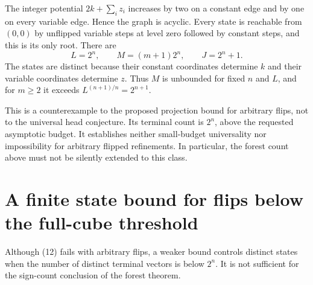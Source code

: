 \documentclass[11pt]{article}
\begin{document}
The integer potential $2k+\sum_i z_i$ increases by two on a constant
edge and by one on every variable edge. Hence the graph is acyclic.
Every state is reachable from $(0,0)$ by unflipped variable steps
at level zero followed by constant steps, and this is its only root. There are
\[
                    L=2^n,\qquad M=(m+1)2^n,\qquad J=2^n+1.
 \tag{18}
\]
The states are distinct because their constant coordinates determine
$k$ and their variable coordinates determine $z$. Thus $M$ is
unbounded for fixed $n$ and $L$, and for $m\ge2$ it exceeds
$L^{(n+1)/n}=2^{n+1}$.

This is a counterexample to the proposed projection bound for arbitrary
flips, not to the universal head conjecture. Its terminal count is
$2^n$, above the requested asymptotic budget. It establishes neither
small-budget universality nor impossibility for arbitrary flipped
refinements. In particular, the forest count above must not be silently
extended to this class.

\section{A finite state bound for flips below the full-cube threshold}

Although (12) fails with arbitrary flips, a weaker bound controls distinct
states when the number of distinct terminal vectors is below $2^n$.
It is not sufficient for the sign-count conclusion of the forest theorem.
\end{document}
